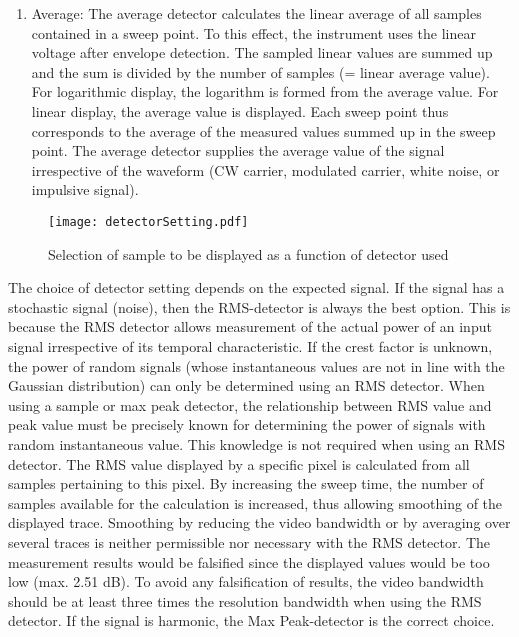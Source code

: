 \begin{enumerate}
  \item Average: The average detector calculates the linear average of all samples contained in a sweep point. To this effect, the instrument uses the linear voltage after envelope detection. The sampled linear values are summed up and the sum is divided by the number of samples (= linear average value). For logarithmic display, the logarithm is formed from the average value. For linear display, the average value is displayed. Each sweep point thus corresponds to the average of the measured values summed up in the sweep point. The average detector supplies the average value of the signal irrespective of the waveform (\acs{CW} carrier, modulated carrier, white noise, or impulsive signal). 
  \end{enumerate}
  
\begin{figure}[H]
\centering
\texttt{[image: detectorSetting.pdf]}
\caption{Selection of sample to be displayed as a function of detector used}
\label{fig:detectorSettings}
\end{figure}

The choice of detector setting depends on the expected signal. If the signal has a stochastic signal (noise), then the \acs{RMS}-detector is always the best option. This is because the \acs{RMS} detector allows measurement of the actual power of an input signal irrespective of its temporal characteristic. If the crest factor is unknown, the power of random signals (whose instantaneous values are not in line with the Gaussian distribution) can only be determined using an \acs{RMS} detector. When using a sample or max peak detector, the relationship between \acs{RMS} value and peak value must be precisely known for determining the power of signals with random instantaneous value. This knowledge is not required when using an \acs{RMS} detector. The \acs{RMS} value displayed by a specific pixel is calculated from all samples pertaining to this pixel. By increasing the sweep time, the number of samples available for the calculation is increased, thus allowing smoothing of the displayed trace. Smoothing by reducing the video bandwidth or by averaging over several traces is neither permissible nor necessary with the \acs{RMS} detector. The measurement results would be falsified since the displayed values would be too low (max. 2.51 dB). To avoid any falsification of results, the video bandwidth should be at least three times the resolution bandwidth when using the \acs{RMS} detector. If the signal is harmonic, the Max Peak-detector is the correct choice. 


